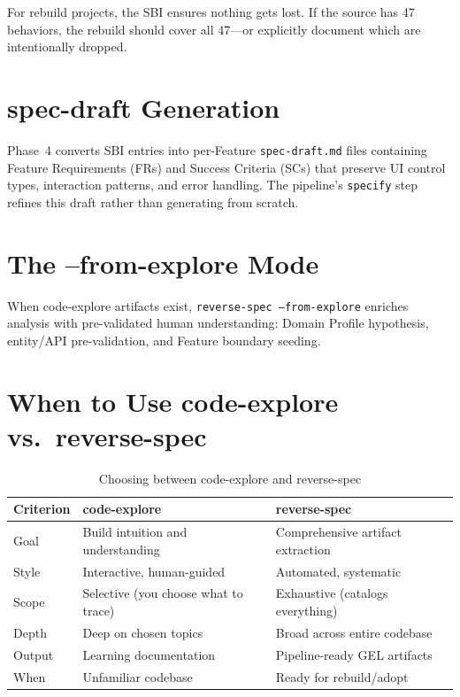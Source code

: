 \documentclass[11pt,a4paper,openright,twoside]{report}
\newcommand{\file}[1]{\texttt{#1}}
\begin{document}
For rebuild projects, the SBI ensures nothing gets lost. If the source has 47 behaviors, the rebuild should cover all 47---or explicitly document which are intentionally dropped.

\section{spec-draft Generation}

Phase~4 converts SBI entries into per-Feature \file{spec-draft.md} files containing Feature Requirements (FRs) and Success Criteria (SCs) that preserve UI control types, interaction patterns, and error handling. The pipeline's \texttt{specify} step refines this draft rather than generating from scratch.

\section{The --from-explore Mode}

When code-explore artifacts exist, \texttt{reverse-spec --from-explore} enriches analysis with pre-validated human understanding: Domain Profile hypothesis, entity/API pre-validation, and Feature boundary seeding.

\section{When to Use code-explore vs.\ reverse-spec}

\begin{table}[H]
\centering
\caption{Choosing between code-explore and reverse-spec}
\label{tab:explore-vs-reverse}
\begin{tabularx}{\textwidth}{lXX}
\toprule
\textbf{Criterion} & \textbf{code-explore} & \textbf{reverse-spec} \\
\midrule
Goal & Build intuition and understanding & Comprehensive artifact extraction \\
Style & Interactive, human-guided & Automated, systematic \\
Scope & Selective (you choose what to trace) & Exhaustive (catalogs everything) \\
Depth & Deep on chosen topics & Broad across entire codebase \\
Output & Learning documentation & Pipeline-ready GEL artifacts \\
When & Unfamiliar codebase & Ready for rebuild/adopt \\
\bottomrule
\end{tabularx}
\end{table}
\end{document}

